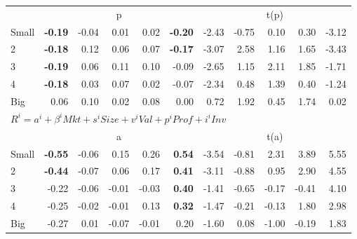 \begin{tabular}{lrrrrrrrrrr}
  
     & \multicolumn{5}{c}{p} & \multicolumn{5}{c}{t(p)}   \\
     \cmidrule(r){2-6} \cmidrule(r){7-11} 
    Small  & \textbf{-0.19}  & -0.04  & 0.01  & 0.02  & \textbf{-0.20}  & -2.43  & -0.75  & 0.10  & 0.30  & -3.12   \\
    2  & \textbf{-0.18}  & 0.12  & 0.06  & 0.07  & \textbf{-0.17}  & -3.07  & 2.58  & 1.16  & 1.65  & -3.43   \\
    3  & \textbf{-0.19}  & 0.06  & 0.11  & 0.10  & -0.09  & -2.65  & 1.15  & 2.11  & 1.85  & -1.71   \\
    4  & \textbf{-0.18}  & 0.03  & 0.07  & 0.02  & -0.07  & -2.34  & 0.48  & 1.39  & 0.40  & -1.24   \\
    Big  & 0.06  & 0.10  & 0.02  & 0.08  & 0.00  & 0.72  & 1.92  & 0.45  & 1.74  & 0.02   \\
    

  \midrule
  \multicolumn{11}{l}{$R^i=a^i+\beta^iMkt+s^iSize+v^iVal+p^iProf+i^iInv$}  \\
  
     & \multicolumn{5}{c}{a} & \multicolumn{5}{c}{t(a)}   \\
     \cmidrule(r){2-6} \cmidrule(r){7-11} 
    Small  & \textbf{-0.55}  & -0.06  & 0.15  & 0.26  & \textbf{0.54}  & -3.54  & -0.81  & 2.31  & 3.89  & 5.55   \\
    2  & \textbf{-0.44}  & -0.07  & 0.06  & 0.17  & \textbf{0.41}  & -3.11  & -0.88  & 0.95  & 2.90  & 4.55   \\
    3  & -0.22  & -0.06  & -0.01  & -0.03  & \textbf{0.40}  & -1.41  & -0.65  & -0.17  & -0.41  & 4.10   \\
    4  & -0.25  & -0.02  & -0.01  & 0.13  & \textbf{0.32}  & -1.47  & -0.21  & -0.13  & 1.80  & 2.98   \\
    Big  & -0.27  & 0.01  & -0.07  & -0.01  & 0.20  & -1.60  & 0.08  & -1.00  & -0.19  & 1.83   \\

  \bottomrule
\end{tabular}
